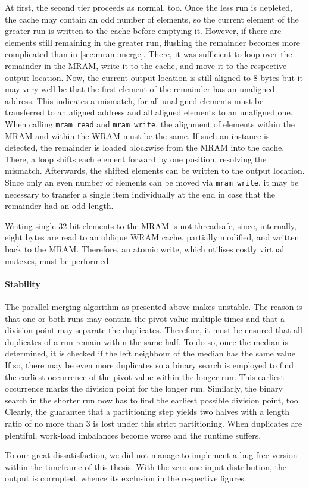 At first, the second tier proceeds as normal, too.
Once the less run is depleted, the cache may contain an odd number of elements, so the current element of the greater run is written to the cache before emptying it.
However, if there are elements still remaining in the greater run, flushing the remainder becomes more complicated than in \cref{sec:mram:merge}.
There, it was sufficient to loop over the remainder in the \ac{MRAM}, write it to the cache, and move it to the respective output location.
Now, the current output location is still aligned to 8 bytes but it may very well be that the first element of the remainder has an unaligned address.
This indicates a mismatch, for all unaligned elements must be transferred to an aligned address and all aligned elements to an unaligned one.
When calling \lstinline|mram_read| and \lstinline|mram_write|, the alignment of elements within the \ac{MRAM} and within the \ac{WRAM} must be the same.
If such an instance is detected, the remainder is loaded blockwise from the \ac{MRAM} into the cache.
There, a loop shifts each element forward by one position, resolving the mismatch.
Afterwards, the shifted elements can be written to the output location.
Since only an even number of elements can be moved via \lstinline|mram_write|, it may be necessary to transfer a single item individually at the end in case that the remainder had an odd length.

Writing single 32-bit elements to the \ac{MRAM} is not threadsafe, since, internally, eight bytes are read to an oblique \ac{WRAM} cache, partially modified, and written back to the \ac{MRAM}.
Therefore, an atomic write, which utilises costly virtual mutexes, must be performed.


\paragraph{Stability}
The parallel merging algorithm as presented above makes \MS{} unstable.
The reason is that one or both runs may contain the pivot value multiple times and that a division point may separate the duplicates.
Therefore, it must be ensured that all duplicates of a run remain within the same half.
To do so, once the median is determined, it is checked if the left neighbour of the median has the same value .
If so, there may be even more duplicates so a binary search is employed to find the earliest occurrence of the pivot value within the longer run.
This earliest occurrence marks the division point for the longer run.
Similarly, the binary search in the shorter run now has to find the earliest possible division point, too.
Clearly, the guarantee that a partitioning step yields two halves with a length ratio of no more than 3 is lost under this strict partitioning.
When duplicates are plentiful, work-load imbalances become worse and the runtime suffers.

To our great dissatisfaction, we did not manage to implement a bug-free version within the timeframe of this thesis.
With the zero-one input distribution, the output is corrupted, whence its exclusion in the respective figures.

